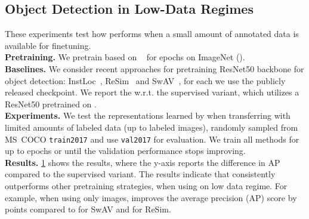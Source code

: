 \subsection{Object Detection in Low-Data Regimes}
\label{sec:low_data}
These experiments test how \model performs when a small amount of annotated data is available for finetuning.
\\
\noindent\textbf{Pretraining.} We pretrain \model based on ~\cite{zhu2020deformable} for  epochs on ImageNet (\imagenetthousand). 
\\
\noindent\textbf{Baselines.} We consider recent approaches for pretraining ResNet50 backbone for object detection: InstLoc~\cite{yang2021insloc},  ReSim~\cite{xiao2021region} and SwAV~\cite{caron2020unsupervised}, for each we use the publicly released checkpoint. We report the  w.r.t. the supervised variant, which utilizes a ResNet50 pretrained on \imagenetthousand.
\\
\noindent\textbf{Experiments.} We test the representations learned by \model when transferring with limited amounts of labeled data (up to  labeled images), randomly sampled from MS~COCO \texttt{train2017} and use \texttt{val2017} for evaluation. We train all methods for up to  epochs or until the validation performance stops improving. 
\vspace{0.1cm}
\\
\noindent\textbf{Results.} \cref{fig:main_coco} shows the results, where the y-axis reports the difference in AP compared to the supervised variant. The results indicate that \model consistently outperforms other pretraining strategies, when using  on low data regime. For example, when using only  images, \model improves the average precision (AP) score by  points compared to  for SwAV and  for ReSim.
\begin{figure}[t]
\centering
{}


\label{fig:main_coco}
\end{figure}


